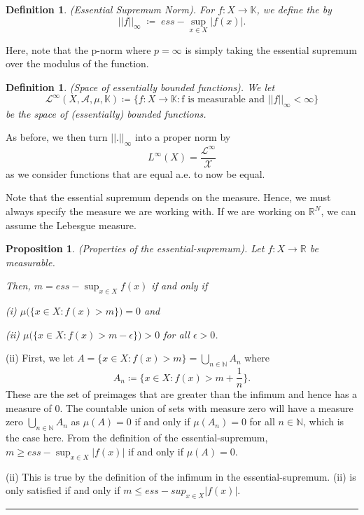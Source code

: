 \documentclass[twoside]{article}
\newtheorem{proposition}[theorem]{Proposition}
\newtheorem{definition}[theorem]{Definition}
\newenvironment{proof}{{\bf Proof:}}{\hfill\rule{2mm}{2mm}}
\begin{document}
\begin{definition}(Essential Supremum Norm). For $f: X \rightarrow \mathbb{K}$, we define the  by
$$
||f||_{\infty} \; \coloneqq \; ess-\sup_{x \in X}|f(x)|.
$$
\end{definition}

Here, note that the p-norm where $p = \infty$ is simply taking the essential supremum over the modulus of the function.

\begin{definition}(Space of essentially bounded functions). We let $$\mathcal{L}^{\infty}(X, \mathcal{A}, \mu, \mathbb{K}) \coloneqq \{f: X \rightarrow \mathbb{K}: \text{f is measurable and } ||f||_{\infty} < \infty\}$$ be the space of (essentially) bounded functions.
\end{definition}

As before, we then turn $||.||_{\infty}$ into a proper norm by
$$
L^{\infty}(X) = \frac{\mathcal{L}^{\infty}}{\mathcal{X}}
$$
as we consider functions that are equal a.e. to now be equal.

Note that the essential supremum depends on the measure. Hence, we must always specify the measure we are working with. If we are working on $\mathbb{R}^N$, we can assume the Lebesgue measure.

\begin{proposition}(Properties of the essential-supremum). Let $f: X \rightarrow \mathbb{R}$ be measurable. 

Then, $m = ess-\sup_{x \in X}f(x)$ if and only if

(i) $\mu\big(\{x \in X: f(x) > m\}\big) = 0$ and 

(ii) $\mu\big(\{x \in X: f(x) > m - \epsilon\}\big) > 0$ for all $\epsilon > 0$.
\end{proposition}

\begin{proof}
(ii) First, we let $A = \{x \in X: f(x) > m\} = \bigcup_{n \in \mathbb{N}}A_n$ where 
$$
A_n \coloneqq \{x \in X: f(x) > m + \frac{1}{n}\}.
$$
These are the set of preimages that are greater than the infimum and hence has a measure of 0. The countable union of sets with measure zero will have a measure zero $\bigcup_{n \in \mathbb{N}}A_n$ as $\mu(A) = 0$ if and only if $\mu(A_n) = 0$ for all $n \in \mathbb{N}$, which is the case here. From the definition of the essential-supremum, $m \geq ess-\sup_{x \in X}|f(x)|$ if and only if $\mu(A) = 0$.

(ii) This is true by the definition of the infimum in the essential-supremum. (ii) is only satisfied if and only if $m \leq ess-sup_{x \in X}|f(x)|$.
\end{proof}
\end{document}
